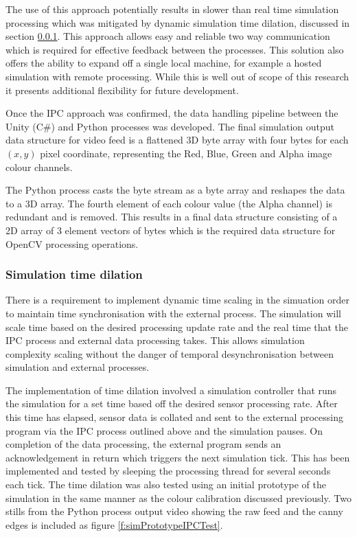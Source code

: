 \documentclass[]{aiaa-tc}%
\begin{document}
 The use of this approach potentially results in slower than real time simulation processing which was mitigated by dynamic simulation time dilation, discussed in section \ref{sect:timedilation}. This approach allows easy and reliable two way communication which is required for effective feedback between the processes. This solution also offers the ability to expand off a single local machine, for example a hosted simulation with remote processing. While this is well out of scope of this research it presents additional flexibility for future development.

Once the IPC approach was confirmed, the data handling pipeline between the Unity (C\#) and Python processes was developed. The final simulation output data structure for video feed is a flattened 3D byte array with four bytes for each $(x,y)$ pixel coordinate, representing the Red, Blue, Green and Alpha image colour channels. 

The Python process casts the byte stream as a byte array and reshapes the data to a 3D array. The fourth element of each colour value (the Alpha channel) is redundant and is removed. This results in a final data structure consisting of a 2D array of 3 element vectors of bytes which is the required data structure for OpenCV processing operations. 

\subsubsection{Simulation time dilation}\label{sect:timedilation}

There is a requirement to implement dynamic time scaling in the simuation order to maintain time synchronisation with the external process. The simulation will scale time based on the desired processing update rate and the real time that the IPC process and external data processing takes. This allows simulation complexity scaling without the danger of temporal desynchronisation between simulation and external processes.

The implementation of time dilation involved a simulation controller that runs the simulation for a set time based off the desired sensor processing rate. After this time has elapsed, sensor data is collated and sent to the external processing program via the IPC process outlined above and the simulation pauses. On completion of the data processing, the external program sends an acknowledgement in return which triggers the next simulation tick. This has been implemented and tested by sleeping the processing thread for several seconds each tick. The time dilation was also tested using an initial prototype of the simulation in the same manner as the colour calibration discussed previously. Two stills from the Python process output video showing the raw feed and the canny edges is included as figure \ref{f:simPrototypeIPCTest}.
\end{document}
